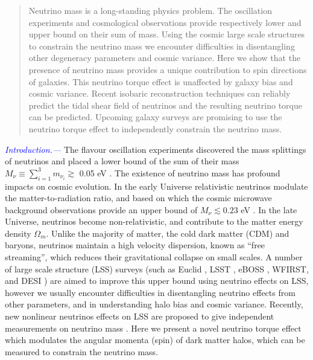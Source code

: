 \documentclass[aps,prd,twocolumn,amsmath,amssymb,amsfont,superscriptaddress]{revtex4-1}
\newcommand{\tcb}{\textcolor{blue}}
\begin{document}
\begin{abstract}
Neutrino mass is a long-standing physics problem. The oscillation experiments and cosmological observations provide respectively lower and upper bound on their sum of mass. Using the cosmic large scale structures to constrain the neutrino mass we encounter difficulties in disentangling other degeneracy parameters and cosmic variance. Here we show that the presence of neutrino mass provides a unique contribution to spin directions of galaxies. This neutrino torque effect is unaffected by galaxy bias and cosmic variance. Recent isobaric reconstruction techniques can reliably predict the tidal shear field of neutrinos and the resulting neutrino torque can be predicted. Upcoming galaxy surveys are promising to use the neutrino torque effect to independently constrain the neutrino mass.

\end{abstract}

\pacs{}

\maketitle

\tcb{\textit{Introduction.---}}
The flavour oscillation experiments \citep{2002PhRvL..89a1301A} discovered the mass splittings of neutrinos and placed a lower bound of the sum of their mass $M_\nu \equiv \sum_{i=1}^3 m_{\nu_i} \gtrsim$ 0.05 eV \citep{2014ChPhC..38i0001O}. 
The existence of neutrino mass has profound impacts on cosmic evolution. 
In the early Universe relativistic neutrinos modulate the matter-to-radiation ratio, and based on which the cosmic microwave background observations provide an upper bound of $M_\nu\lesssim 0.23$ eV \citep{2016A&A...594A..13P}. 
In the late Universe, neutrinos become non-relativistic, and contribute to the matter energy density $\Omega_m$. 
Unlike the majority of matter, the cold dark matter (CDM) and baryons, neutrinos maintain a high velocity dispersion, known as ``free streaming'', which reduces their gravitational collapse on small scales. A number of large scale structure (LSS) surveys 
(such as Euclid \cite{2011arXiv1110.3193L},
LSST \cite{2009arXiv0912.0201L}, eBOSS \cite{2016AJ....151...44D},
WFIRST\cite{2012SPIE.8442E..1UG}, and DESI \cite{2015AAS...22533605E}) 
are aimed to improve this upper bound using neutrino effects on LSS,
however we usually encounter difficulties in disentangling neutrino effects from other parameters, and in understanding halo bias and cosmic variance.
Recently, new nonlinear neutrinos effects on LSS are proposed to give independent measurements on neutrino mass \citep{2014PhRvL.113m1301Z,2016PhRvL.116n1301Z,2017NatAs...1E.143Y}.
Here we present a novel neutrino torque effect which modulates the angular momenta (spin) of dark matter halos, which can be measured to constrain the neutrino mass.
\end{document}
